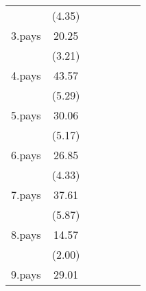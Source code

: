 {\begin{tabular}{l*{6}{c}}
                    &      (4.35)         &                     &                     &                     &                     &                     \\
[1em]
3.pays              &       20.25\sym{**} &                     &                     &                     &                     &                     \\
                    &      (3.21)         &                     &                     &                     &                     &                     \\
[1em]
4.pays              &       43.57\sym{***}&                     &                     &                     &                     &                     \\
                    &      (5.29)         &                     &                     &                     &                     &                     \\
[1em]
5.pays              &       30.06\sym{***}&                     &                     &                     &                     &                     \\
                    &      (5.17)         &                     &                     &                     &                     &                     \\
[1em]
6.pays              &       26.85\sym{***}&                     &                     &                     &                     &                     \\
                    &      (4.33)         &                     &                     &                     &                     &                     \\
[1em]
7.pays              &       37.61\sym{***}&                     &                     &                     &                     &                     \\
                    &      (5.87)         &                     &                     &                     &                     &                     \\
[1em]
8.pays              &       14.57\sym{*}  &                     &                     &                     &                     &                     \\
                    &      (2.00)         &                     &                     &                     &                     &                     \\
[1em]
9.pays              &       29.01\sym{***}&                     &                     &                     &                     &                     \\

\end{tabular}}
